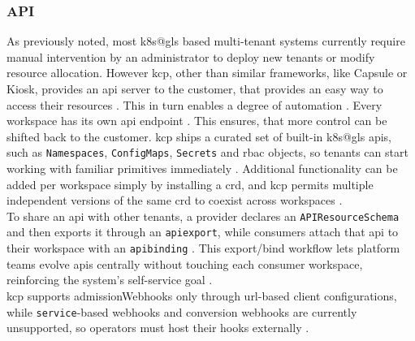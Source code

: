 \documentclass[11pt, a4paper, oneside, listof=totoc]{scrartcl}
\begin{document}
            \subsubsection{API}\label{subsubsec:api}
                As previously noted, most \gls{k8s@gls} based multi-tenant systems currently require
                manual intervention by an administrator to deploy new tenants or modify resource
                allocation.
                However \gls{kcp}, other than similar frameworks, like Capsule or Kiosk, provides an
                \gls{api} server to the customer, that provides an easy way to access
                their resources \parencites[p.~651]{nguyen2022}{kcpio}.
                This in turn enables a degree of automation \parencite[p.~651]{nguyen2022}.
                Every workspace has its own \gls{api} endpoint \parencite{kcpWorkspaces}.
                This ensures, that more control can be shifted back to the customer.
                \gls{kcp} ships a curated set of built-in \gls{k8s@gls} \glspl{api}, such as
                \texttt{Namespaces}, \texttt{ConfigMaps}, \texttt{Secrets} and \gls{rbac} objects, 
                so tenants can start working with familiar primitives immediately
                \parencite{kcpAPIsBuiltIn}.
                Additional functionality can be added per workspace simply by installing a
                \gls{crd}, and \gls{kcp} permits multiple independent versions of the same \gls{crd}
                to coexist across workspaces \parencite{kcpAPIs}.
                \\
                To share an \gls{api} with other tenants, a provider declares an
                \texttt{APIResourceSchema} and then exports it through an \texttt{\gls{apiexport}},
                while consumers attach that \gls{api} to their workspace with an \texttt{\gls{apibinding}}
                \parencite{kcpAPIsExport}.
                This export/bind workflow lets platform teams evolve \glspl{api} centrally without
                touching each consumer workspace, reinforcing the system's self-service goal
                \parencite{kcpAPIsExport}.
                \\
                \gls{kcp} supports \glspl{admissionWebhook} only through \gls{url}-based client
                configurations, while \texttt{service}-based webhooks and conversion webhooks are
                currently unsupported, so operators must host their hooks externally
                \parencite{kcpAPIsAdmissionWebhooks}.
                \\
\end{document}
